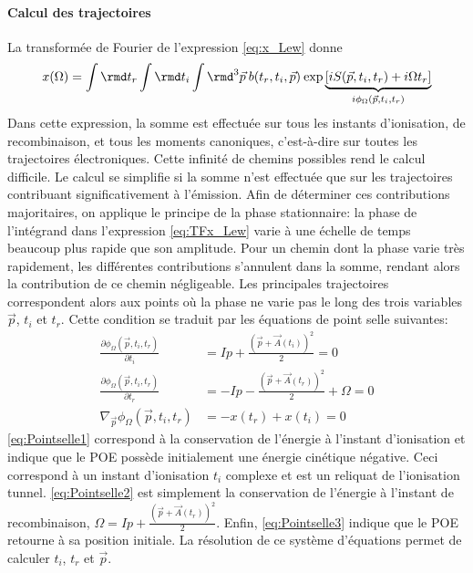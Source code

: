 \paragraph{Calcul des trajectoires} La transformée de Fourier de l'expression \ref{eq:x_Lew} donne
\begin{equation}
x(\Omega) = \int \rmd t_r \int \rmd t_i \int \rmd^3 \vec{p} \: b(t_r,t_i, \vec{p}) \: \text{exp}\underbrace{\left[i S(\vec{p}, t_i, t_r) + i \Omega t_r \right]}_{i \phi_\Omega(\vec{p}, t_i, t_r)}
\label{eq:TFx_Lew}
\end{equation}
Dans cette expression, la somme est effectuée sur tous les instants d'ionisation, de recombinaison, et tous les moments canoniques, c'est-à-dire sur toutes les trajectoires électroniques. Cette infinité de chemins possibles rend le calcul difficile. Le calcul se simplifie si la somme n'est effectuée que sur les trajectoires contribuant significativement à l'émission. Afin de déterminer ces contributions majoritaires, on applique le principe de la phase stationnaire: la phase de l'intégrand dans l'expression \ref{eq:TFx_Lew} varie à une échelle de temps beaucoup plus rapide que son amplitude. Pour un chemin dont la phase varie très rapidement, les différentes contributions s'annulent dans la somme, rendant alors la contribution de ce chemin négligeable. Les principales trajectoires correspondent alors aux points où la phase ne varie pas le long des trois variables $\vec{p}$, $t_i$ et $t_r$. Cette condition se traduit par les équations de point selle suivantes:
\begin{align}
\frac{\partial \phi_\Omega(\vec{p}, t_i, t_r)}{\partial t_i} & = Ip + \frac{(\vec{p} + \vec{A}(t_i))^2}{2} = 0 \label{eq:Pointselle1}\\
\frac{\partial \phi_\Omega(\vec{p}, t_i, t_r)}{\partial t_r} & = -Ip - \frac{(\vec{p} + \vec{A}(t_r))^2}{2} + \Omega = 0 \label{eq:Pointselle2}\\
\nabla_{\vec{p}} \phi_\Omega(\vec{p}, t_i, t_r) & = - x(t_r) + x(t_i) = 0 \label{eq:Pointselle3}
\end{align}
\ref{eq:Pointselle1} correspond à la conservation de l'énergie à l'instant d'ionisation et indique que le POE possède initialement une énergie cinétique négative. Ceci correspond à un instant d'ionisation $t_i$ complexe et est un reliquat de l'ionisation tunnel. \ref{eq:Pointselle2} est simplement la conservation de l'énergie à l'instant de recombinaison, $\Omega = Ip + \frac{(\vec{p} + \vec{A}(t_r))^2}{2}$. Enfin, \ref{eq:Pointselle3} indique que le POE retourne à sa position initiale. La résolution de ce système d'équations permet de calculer $t_i$, $t_r$ et $\vec{p}$.

